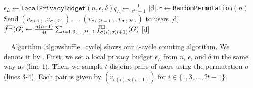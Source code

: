 \setlength{\algomargin}{5mm}
\begin{algorithm}[t]
  \SetAlgoLined
  $\epsilon_L \leftarrow \texttt{LocalPrivacyBudget}(n,\epsilon,\delta)$\;
  [d] $q_L \leftarrow \frac{1}{e^{\epsilon_L}+1}$\;
  [d] $\sigma \leftarrow$\texttt{RandomPermutation}$(n)$\;
  [d] Send $(v_{\sigma(1)}, v_{\sigma(2)}), \ldots, (v_{\sigma(2t-1)}, v_{\sigma(2t)})$ to users\;
  [d] $\hat{f}^\square(G) \leftarrow \frac{n(n-1)}{4t}\sum_{i=1,3,\ldots,2t-1} \hat{f}_{\sigma(i),\sigma(i+1)}^\square(G)$\;
  [d] 
  \caption{Our 4-cycle counting algorithm \AlgWSCyc{}.
  \AlgWS{} is shown in Algorithm~\ref{alg:WShuffle}.
  }\label{alg:wshuffle_cycle}
\end{algorithm}

~~Algorithm \ref{alg:wshuffle_cycle} shows our 4-cycle counting algorithm. 
We denote it by \AlgWSCyc{}. 
First, we set a local privacy budget $\epsilon_L$ from $n$, $\epsilon$, and $\delta$ in the same way as \AlgWSLE{} (line 1). 
Then, we sample $t$ disjoint pairs of users using the permutation $\sigma$ (lines 3-4). 
Each pair is given by $(v_{\sigma(i), \sigma(i+1)})$ for $i \in \{1, 3, \ldots, 2t-1\}$.

